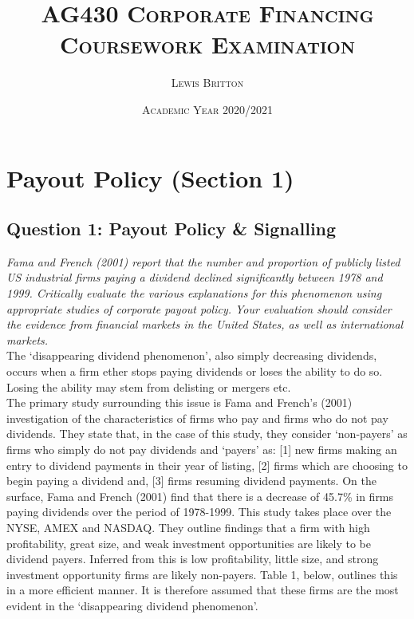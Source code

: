 \documentclass[11pt, english]{article}
\begin{document}

        \title{\textsc{AG430 Corporate Financing\\ Coursework Examination}}
        \author{\textsc{Lewis Britton}}
        \date{\textsc{Academic Year 2020/2021}}
        \maketitle

\newpage


        \renewcommand{\contentsname}{Table of Contents} 

	\tableofcontents

\newpage


\section{Payout Policy (Section 1)}

	\subsection{Question 1: Payout Policy \& Signalling}

	\textit{Fama and French (2001) report that the number and proportion of publicly listed US industrial firms paying a dividend declined significantly between 1978 and 1999. Critically evaluate the various explanations for this phenomenon using appropriate studies of corporate payout policy. Your evaluation should consider the evidence from financial markets in the United States, as well as international markets.}\\

	The `disappearing dividend phenomenon', also simply decreasing dividends, occurs when a firm ether stops paying dividends or loses the ability to do so. Losing the ability may stem from delisting or mergers etc.\\

	The primary study surrounding this issue is Fama and French’s (2001) investigation of the characteristics of firms who pay and firms who do not pay dividends. They state that, in the case of this study, they consider `non-payers' as firms who simply do not pay dividends and `payers' as: [1] new firms making an entry to dividend payments in their year of listing, [2] firms which are choosing to begin paying a dividend and, [3] firms resuming dividend payments. On the surface, Fama and French (2001) find that there is a decrease of 45.7\% in firms paying dividends over the period of 1978-1999. This study takes place over the NYSE, AMEX and NASDAQ. They outline findings that a firm with high profitability, great size, and weak investment opportunities are likely to be dividend payers. Inferred from this is low profitability, little size, and strong investment opportunity firms are likely non-payers. Table 1, below, outlines this in a more efficient manner. It is therefore assumed that these firms are the most evident in the `disappearing dividend phenomenon'.\\
\end{document}
